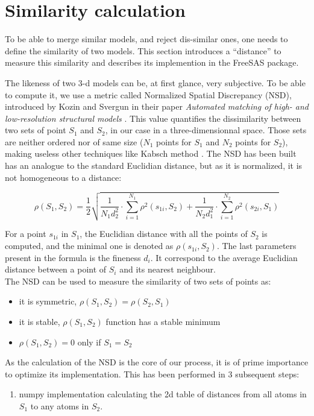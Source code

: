\documentclass[a4paper, 11pt]{report}
\begin{document}
\section{Similarity calculation}

To be able to merge similar models, and reject dis-similar ones,
one needs to define the similarity of two models. 
This section introduces a ``distance'' to measure this  
similarity and describes its implemention in the FreeSAS
package.

The likeness of two 3-d models can be, at first glance, very 
subjective. 
To be able to compute it, we use a metric called Normalized Spatial 
Discrepancy (NSD), introduced by Kozin and Svergun in their paper 
\textit{Automated matching of high- and low-resolution structural 
models} \cite{supcomb}. 
This value quantifies the dissimilarity between two sets of 
point $S_{1}$ and $S_{2}$, in our case in a three-dimensionnal space.
Those sets are neither ordered nor of same size ($N_{1}$ points for
$S_{1}$ and $N_{2}$ points for
$S_{2}$), making useless other techniques like Kabsch method
\cite{kabsh1976}.
The NSD has been built has an analogue to the standard Euclidian distance,
but as it is normalized, it is not homogeneous to a distance:

\[
\rho(S_{1},S_{2})= \frac{1}{2} \sqrt {\frac{1}{N_{1}d_{2}^2} 
\cdot \sum\limits_{i=1}^{N_{1}} \rho^2(s_{1i}, S_{2}) + \frac{1}{N_{2}d_{1}^2} \cdot \sum\limits_{i=1}^{N_{2}} \rho^2(s_{2i}, S_{1})}
\]

For a point $s_{1i}$ in $S_{1}$, the Euclidian distance with all the 
points of $S_{2}$ is computed, and the minimal one is denoted as 
$\rho(s_{1i}, S_{2})$. 
The last parameters present in the formula is the fineness $d_{i}$. 
It correspond to the average Euclidian distance between a point of 
$S_{i}$ and its nearest neighbour.\\
The NSD can be used to measure the similarity of two sets of points as:
\begin{itemize}
 \item it is symmetric, $\rho(S_{1},S_{2}) = \rho(S_{2},S_{1})$
 \item it is stable, $\rho(S_{1},S_{2})$ function has a stable minimum
 \item $\rho(S_{1},S_{2}) = 0$ only if $S_{1} = S_{2}$
\end{itemize}

As the calculation of the NSD is the core of our process, it is of prime  
importance to optimize its implementation. This has been performed in 3
subsequent steps:
\begin{enumerate}
  \item numpy implementation calculating the 2d table of distances from all
  atoms in $S_{1}$ to any atoms in $S_{2}$.
\end{enumerate}
\end{document}
